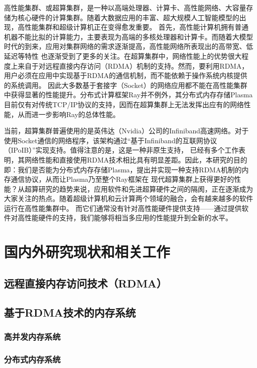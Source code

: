 高性能集群、或超算集群，是一种以高端处理器、计算卡、高性能网络、大容量存储为核心硬件的计算集群。随着大数据应用的丰富、超大规模人工智能模型的出现，高性能集群和超级计算机正在变得愈发重要。
首先，高性能计算机拥有普通机器不能比拟的计算能力，主要表现为高端的多核处理器和计算卡。而随着大模型时代的到来，应用对集群网络的需求逐渐提高，高性能网络所表现出的高带宽、低延迟等特性
也逐渐受到了更多的关注。在超算集群中，网络性能上的优势很大程度上来自于对远程直接内存访问（RDMA）机制的支持。然而，要利用RDMA，用户必须在应用中实现基于RDMA的通信机制，而不能依赖于操作系统内核提供的系统调用。
因此大多数基于套接字（Socket）的网络应用都不能在高性能集群中获得显著的性能提升。分布式计算框架Ray并不例外，其分布式内存存储Plasma目前仅有对传统TCP/IP协议的支持，因而在超算集群上无法发挥出应有的网络性能，从而进一步影响Ray的总体性能。

当前，超算集群普遍使用的是英伟达（Nvidia）公司的Infiniband高速网络。对于使用Socket通信的网络程序，该架构通过“基于Infiniband的互联网协议（IPoIB）”实现支持。值得注意的是，这是一种非原生支持，
已经有多个工作表明，其网络性能和直接使用RDMA技术相比具有明显差距。因此，本研究的目的即：我们是否能为分布式内存存储Plasma，提出并实现一种支持RDMA机制的内存通信协议，从而让Plasma乃至整个Ray框架在
现代超算集群上获得更好的性能？从超算研究的趋势来说，应用软件和先进超算硬件之间的隔阂，正在逐渐成为大家关注的热点。随着超级计算机和云计算两个领域的融合，会有越来越多的软件运行在高性能集群中。
而它们通常没有针对高性能硬件提供支持——通过提供软件对高性能硬件的支持，我们能够将相当多应用的性能提升到全新的水平。

\section{国内外研究现状和相关工作}
\label{sec:related_work}

\subsection{远程直接内存访问技术（RDMA）}



\subsection{基于RDMA技术的内存系统}

\subsubsection{高并发内存系统}

\subsubsection{分布式内存系统}

